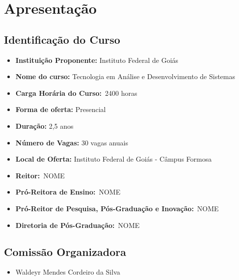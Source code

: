 \documentclass[11pt,fleqn]{book} %
\newcommand{\VER}[1]{\begingroup\color{red}#1\endgroup}
\begin{document}
\renewcommand\contentsname{Sumário}
\tableofcontents

\chapter{Apresentação}
\vspace{12em}



\newpage  
\section{Identificação do Curso}
\begin{itemize}
	\item \textbf{Instituição Proponente:} Instituto Federal de Goiás
	\item \textbf{Nome do curso:} Tecnologia em Análise e Desenvolvimento de Sistemas
	\item \textbf{Carga Horária do Curso:}~\VER{2400} horas
	\item \textbf{Forma de oferta:} Presencial
	\item \textbf{Duração:} 2,5 anos
	\item \textbf{Número de Vagas:} 30 vagas anuais
	\item \textbf{Local de Oferta:} Instituto Federal de Goiás - Câmpus Formosa
	\item \textbf{Reitor:}~\VER{NOME}
	\item \textbf{Pró-Reitora de Ensino:}~\VER{NOME}
	\item \textbf{Pró-Reitor de Pesquisa, Pós-Graduação e Inovação:}~\VER{NOME}
	\item \textbf{Diretoria de Pós-Graduação:}~\VER{NOME}
\end{itemize}

\section{Comissão Organizadora}
	\begin{itemize}[label=\bfseries]
		\item Waldeyr Mendes Cordeiro da Silva
	\end{itemize}
\end{document}
